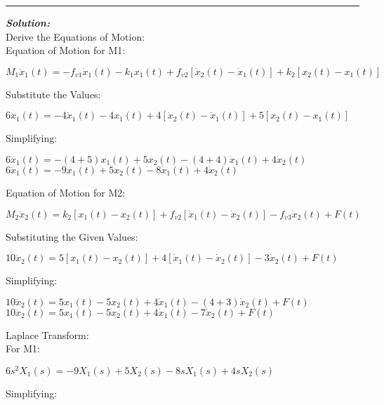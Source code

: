 \documentclass[11pt,letterpaper]{article}
\begin{document}
\rule{\textwidth}{1pt}
\vspace{12pt}
\textit{\textbf{Solution:}}\\
Derive the Equations of Motion:\\[12pt]
Equation of Motion for M1:\\
\begin{center}
	$M_1\ddot{x}_1(t)=-f_{v1}\dot{x}_1(t)-k_1x_1(t)+f_{v2}[\dot{x}_2(t)-\dot{x}_1(t)]+k_2[x_2(t)-x_1(t)]$\\
\end{center}
Substitute the Values:\\
\begin{center}
	$6\ddot{x}_1(t)=-4\dot{x}_1(t)-4x_1(t)+4[\dot{x}_2(t)-\dot{x}_1(t)]+5[x_2(t)-x_1(t)]$\\
\end{center}
Simplifying:\\
\begin{center}
	$6\ddot{x}_1(t)=-(4+5)x_1(t)+5x_2(t)-(4+4)\dot{x}_1(t)+4\dot{x}_2(t)$\\[12pt]
	$6\ddot{x}_1(t)=-9x_1(t)+5x_2(t)-8\dot{x}_1(t)+4\dot{x}_2(t)$\\[12pt]
\end{center}
Equation of Motion for M2:\\
\begin{center}
	$M_2\ddot{x}_2(t)=k_2[x_1(t)-x_2(t)]+f_{v2}[\dot{x}_1(t)-\dot{x}_2(t)]-f_{v3}\dot{x}_2(t)+F(t)$\\
\end{center}
Substituting the Given Values:\\
\begin{center}
	$10\ddot{x}_2(t)=5[x_1(t)-x_2(t)]+4[\dot{x}_1(t)-\dot{x}_2(t)]-3\dot{x}_2(t)+F(t)$\\
\end{center}
Simplifying:\\
\begin{center}
	$10\ddot{x}_2(t)=5x_1(t)-5x_2(t)+4\dot{x}_1(t)-(4+3)\dot{x}_2(t)+F(t)$\\[12pt]
	$10\ddot{x}_2(t)=5x_1(t)-5x_2(t)+4\dot{x}_1(t)-7\dot{x}_2(t)+F(t)$\\
\end{center}
Laplace Transform:\\[12pt]
For M1:\\
\begin{center}
	$6s^2X_1(s)=-9X_1(s)+5X_2(s)-8sX_1(s)+4sX_2(s)$\\[12pt]
\end{center}
Simplifying:\\
\end{document}

